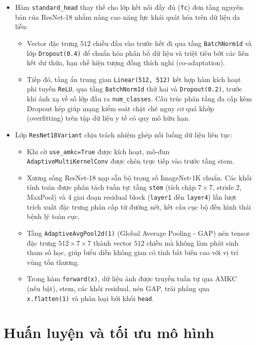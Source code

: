 \begin{itemize}
  \item Hàm \texttt{standard\_head} thay thế cho lớp kết nối đầy đủ (\texttt{fc}) đơn tầng nguyên bản của ResNet-18 nhằm nâng cao năng lực khái quát hóa trên dữ liệu da liễu:
  \begin{itemize}
    \item Vector đặc trưng $512$ chiều đầu vào trước hết đi qua tầng \texttt{BatchNorm1d} và lớp \texttt{Dropout(0.4)} để chuẩn hóa phân bố dữ liệu và triệt tiêu bớt các liên kết dư thừa, hạn chế hiện tượng đồng thích nghi (co-adaptation).
    \item Tiếp đó, tầng ẩn trung gian \texttt{Linear(512, 512)} kết hợp hàm kích hoạt phi tuyến \texttt{ReLU}, qua tầng \texttt{BatchNorm1d} thứ hai và \texttt{Dropout(0.2)}, trước khi ánh xạ về số lớp đầu ra \texttt{num\_classes}. Cấu trúc phân tầng đa cấp kèm Dropout kép giúp mạng kiểm soát chặt chẽ nguy cơ quá khớp (overfitting) trên tập dữ liệu y tế có quy mô hữu hạn.
  \end{itemize}
  \item Lớp \texttt{ResNet18Variant} chịu trách nhiệm ghép nối luồng dữ liệu liên tục:
  \begin{itemize}
    \item Khi cờ \texttt{use\_amkc=True} được kích hoạt, mô-đun \texttt{AdaptiveMultiKernelConv} được chèn trực tiếp vào trước tầng stem.
    \item Xương sống ResNet-18 nạp sẵn bộ trọng số ImageNet-1K chuẩn. Các khối tính toán được phân tách tuần tự: tầng \texttt{stem} (tích chập $7\times7$, stride 2, MaxPool) và 4 giai đoạn residual block (\texttt{layer1} đến \texttt{layer4}) lần lượt trích xuất đặc trưng phân cấp từ đường nét, kết cấu cục bộ đến hình thái bệnh lý toàn cục.
    \item Tầng \texttt{AdaptiveAvgPool2d(1)} (Global Average Pooling - GAP) nén tensor đặc trưng $512 \times 7 \times 7$ thành vector $512$ chiều mà không làm phát sinh tham số học, giúp biểu diễn không gian có tính bất biến cao với vị trí vùng tổn thương.
    \item Trong hàm \texttt{forward(x)}, dữ liệu ảnh được truyền tuần tự qua AMKC (nếu bật), stem, các khối residual, nén GAP, trải phẳng qua \texttt{x.flatten(1)} và phân loại bởi khối \texttt{head}.
  \end{itemize}
\end{itemize}


\section{Huấn luyện và tối ưu mô hình}

